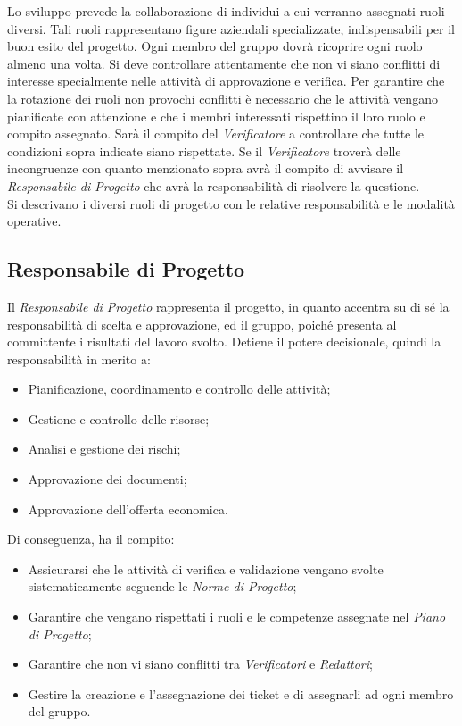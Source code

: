 Lo sviluppo prevede la collaborazione di individui a cui verranno assegnati ruoli diversi. Tali ruoli rappresentano figure aziendali specializzate, indispensabili per il buon esito del progetto. Ogni membro del gruppo dovrà ricoprire ogni ruolo almeno una volta. Si deve controllare attentamente che non vi siano conflitti di interesse specialmente nelle attività di approvazione e verifica. Per garantire che la rotazione dei ruoli non provochi conflitti è necessario che le attività vengano pianificate con attenzione e che i membri interessati rispettino il loro ruolo e compito assegnato. Sarà il compito del \textit{Verificatore} a controllare che tutte le condizioni sopra indicate siano rispettate. Se il \textit{Verificatore} troverà delle incongruenze con quanto menzionato sopra avrà il compito di avvisare il \textit{Responsabile di Progetto} che avrà la responsabilità di risolvere la questione.\\
Si descrivano i diversi ruoli di progetto con le relative responsabilità e le modalità operative.
\subsection{Responsabile di Progetto}
Il \textit{Responsabile di Progetto} rappresenta il progetto, in quanto accentra su di sé la responsabilità di scelta e approvazione, ed il gruppo, poiché presenta al committente i risultati del lavoro svolto.
Detiene il potere decisionale, quindi la responsabilità in merito a:
\begin{itemize}
	\item Pianificazione, coordinamento e controllo delle attività;
	\item Gestione e controllo delle risorse;
	\item Analisi e gestione dei rischi;
	\item Approvazione dei documenti;
	\item Approvazione dell'offerta economica.
\end{itemize}
Di conseguenza, ha il compito:
\begin{itemize}
	\item Assicurarsi che le attività di verifica e validazione vengano svolte sistematicamente seguende le \textit{Norme di Progetto};
	\item Garantire che vengano rispettati i ruoli e le competenze assegnate nel \textit{Piano di Progetto};
	\item Garantire che non vi siano conflitti tra \textit{Verificatori} e \textit{Redattori};
	\item Gestire la creazione e l'assegnazione dei ticket e di assegnarli ad ogni membro del gruppo.
\end{itemize}
